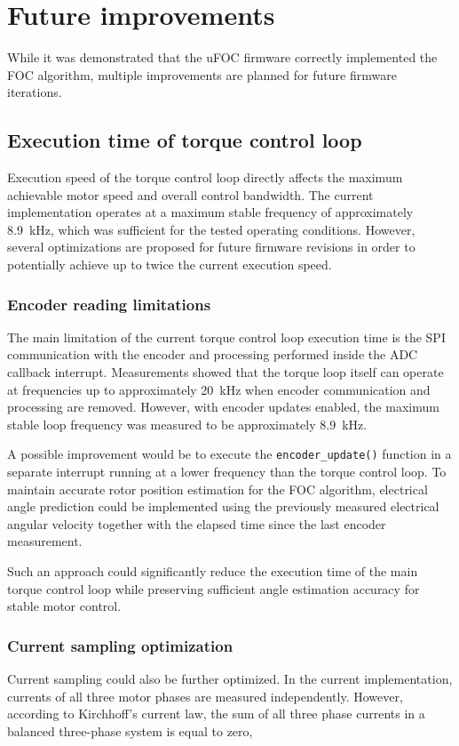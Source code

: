 \chapter{Future improvements}
While it was demonstrated that the uFOC firmware correctly implemented the FOC algorithm, 
multiple improvements are planned for future firmware iterations.

\section{Execution time of torque control loop}
Execution speed of the torque control loop directly affects the maximum achievable motor speed and overall control bandwidth.
The current implementation operates at a maximum stable frequency of approximately 8.9~kHz, which was sufficient for the tested operating conditions.
However, several optimizations are proposed for future firmware revisions in order to potentially achieve up to twice the current execution speed.

\subsection{Encoder reading limitations}
The main limitation of the current torque control loop execution time is the SPI communication
with the encoder and processing performed inside the ADC callback interrupt.
Measurements showed that the torque loop itself can operate at frequencies up to approximately 20~kHz 
when encoder communication and processing are removed.
However, with encoder updates enabled, the maximum stable loop frequency was measured to be approximately 8.9~kHz.

A possible improvement would be to execute the \texttt{encoder\_update()} function in a 
separate interrupt running at a lower frequency than the torque control loop.
To maintain accurate rotor position estimation for the FOC algorithm, 
electrical angle prediction could be implemented using the previously measured 
electrical angular velocity together with the elapsed time since the last encoder measurement.

Such an approach could significantly reduce the execution time of the main torque control loop
while preserving sufficient angle estimation accuracy for stable motor control.

\subsection{Current sampling optimization}
Current sampling could also be further optimized. In the current implementation, currents of all three motor phases are measured independently.
However, according to Kirchhoff's current law, the sum of all three phase currents in a balanced three-phase system is equal to zero,

